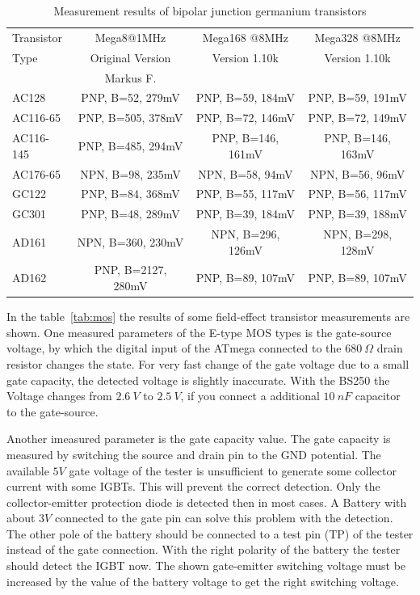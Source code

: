 \begin{table}[H]
  \begin{center}
    \begin{tabular}{| l | c | c | c |}
    \hline
 Transistor & Mega8@1MHz          & Mega168 @8MHz       & Mega328 @8MHz    \\
    Type    & Original Version    & Version 1.10k       & Version 1.10k  \\
            & Markus F.           &                     &        \\
    \hline
    \hline
AC128       & PNP, B=52, 279mV    & PNP, B=59, 184mV    & PNP, B=59, 191mV    \\
    \hline
AC116-65    & PNP, B=505, 378mV   & PNP, B=72, 146mV    & PNP, B=72, 149mV    \\
    \hline
AC116-145   & PNP, B=485, 294mV   & PNP, B=146, 161mV    & PNP, B=146, 163mV   \\
    \hline
AC176-65    & NPN, B=98, 235mV    & NPN, B=58, 94mV    & NPN, B=56, 96mV     \\
    \hline
GC122       & PNP, B=84, 368mV    & PNP, B=55, 117mV    & PNP, B=56, 117mV    \\
    \hline
GC301       & PNP, B=48, 289mV    & PNP, B=39, 184mV    & PNP, B=39, 188mV    \\
    \hline
AD161       & NPN, B=360, 230mV   & NPN, B=296, 126mV   & NPN, B=298, 128mV    \\
    \hline
AD162       & PNP, B=2127, 280mV  & PNP, B=89, 107mV    & PNP, B=89, 107mV    \\
    \hline
    \end{tabular}
  \end{center}
  \caption{Measurement results of bipolar junction germanium transistors}
  \label{tab:germanium}
\end{table}

In the table~\ref{tab:mos} the results of some field-effect transistor measurements are shown.
One measured parameters of the E-type MOS types is the gate-source voltage, by which the
digital input of the ATmega connected to the \(680~\Omega\) drain resistor
changes the state.
For very fast change of the gate voltage due to a small gate capacity, the detected voltage is
slightly inaccurate.
With the BS250 the Voltage changes from \(2.6~V\) to \(2.5~V\), if you connect a additional
\(10~nF\) capacitor to the gate-source.

Another imeasured parameter is the gate capacity value.
The gate capacity is measured by switching the source and drain pin to the GND potential.
The available \(5V\) gate voltage of the tester is unsufficient to generate some collector current
with some IGBTs. This will prevent the correct detection.
Only the collector-emitter protection diode is detected then in most cases.
A Battery with about \(3V\) connected to the gate pin can solve this problem with the detection.
The other pole of the battery should be connected to a test pin (TP) of the tester instead of the gate connection.
With the right polarity of the battery the tester should detect the IGBT now.
The shown gate-emitter switching voltage must be increased by the value of the battery voltage
to get the right switching voltage.

